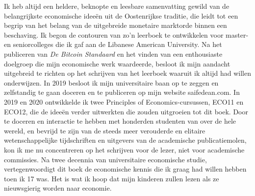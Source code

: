 Ik heb altijd een heldere, beknopte en leesbare samenvatting gewild van de belangrijkste economische ideeën uit de Oostenrijkse traditie, die leidt tot een begrip van het belang van de uitgebreide monetaire marktorde binnen een beschaving. Ik begon de contouren van zo'n leerboek te ontwikkelen voor master- en seniorcolleges die ik gaf aan de Libanese American University. Na het publiceren van \textit{De Bitcoin Standaard} en het vinden van een enthousiaste doelgroep die mijn economische werk waardeerde, besloot ik mijn aandacht uitgebreid te richten op het schrijven van het leerboek waaruit ik altijd had willen onderwijzen. In 2019 besloot ik mijn universitaire baan op te zeggen en zelfstandig te gaan doceren en te publiceren op mijn website saifedean.com. In 2019 en 2020 ontwikkelde ik twee Principles of Economics-cursussen, ECO11 en ECO12, die de ideeën verder uitwerkten die zouden uitgroeien tot dit boek.
Door te doceren en interactie te hebben met honderden studenten van over de hele wereld, en bevrijd te zijn van de steeds meer verouderde en elitaire wetenschappelijke tijdschriften en uitgevers van de academische publicatiemolen, kon ik me nu concentreren op het schrijven voor de lezer, niet voor academische commissies. Na twee decennia van universitaire economische studie, vertegenwoordigt dit boek de economische kennis die ik graag had willen hebben toen ik 17 was. Het is wat ik hoop dat mijn kinderen zullen lezen als ze nieuwsgierig worden naar economie.

